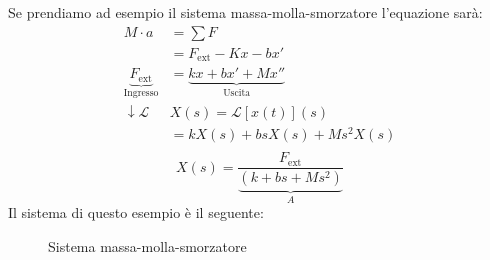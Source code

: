 \documentclass[a4paper]{article}
\begin{document}
\begin{example}
  Se prendiamo ad esempio il sistema massa-molla-smorzatore l'equazione sarà:
  \[
    \begin{aligned}
      M \cdot a &= \sum F\\
                &= F_{\text{ext}} - Kx - bx'\\
      \underbrace{F_{\text{ext}}}_{\text{Ingresso}} &= \underbrace{kx + bx'+Mx''}_
                {\text{Uscita}}\\
      \downarrow \mathcal{L} & X(s) = \mathcal{L}\left[ x(t) \right](s) \\
                             &= k X(s) +bs X(s)+ M s^2 X(s)\\
    \end{aligned}
  \] 
  \[
    X(s) = \frac{F_{\text{ext}}}{\underbrace{\left( k + bs + Ms^2 \right)}_{A}}
  \] 
  \noindent
  Il sistema di questo esempio è il seguente:
  \begin{figure}[H]
    \centering
    \caption{Sistema massa-molla-smorzatore}
  \end{figure}
\end{example}
\end{document}
